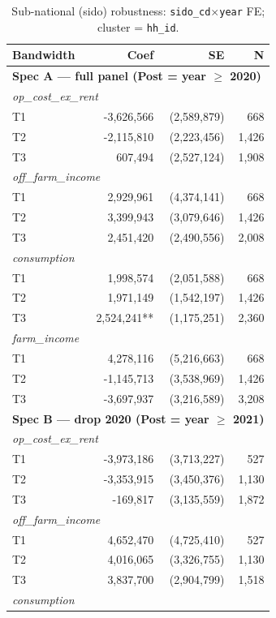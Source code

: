 \begin{table}[t]
\centering
\caption{Sub-national (sido) robustness: \texttt{sido\_cd}$\times$\texttt{year} FE; cluster = \texttt{hh\_id}.}
\label{tab:sido_robustness_en}
\begin{tabular}{lrrr}
\toprule
Bandwidth & Coef & SE & N \\
\midrule
\multicolumn{4}{l}{\textbf{Spec A — full panel (Post = year $\ge$ 2020)}} \\
\multicolumn{4}{l}{\textit{op\_cost\_ex\_rent}} \\
T1 & -3,626,566 & (2,589,879) & 668 \\
T2 & -2,115,810 & (2,223,456) & 1,426 \\
T3 & 607,494 & (2,527,124) & 1,908 \\
\multicolumn{4}{l}{\textit{off\_farm\_income}} \\
T1 & 2,929,961 & (4,374,141) & 668 \\
T2 & 3,399,943 & (3,079,646) & 1,426 \\
T3 & 2,451,420 & (2,490,556) & 2,008 \\
\multicolumn{4}{l}{\textit{consumption}} \\
T1 & 1,998,574 & (2,051,588) & 668 \\
T2 & 1,971,149 & (1,542,197) & 1,426 \\
T3 & 2,524,241** & (1,175,251) & 2,360 \\
\multicolumn{4}{l}{\textit{farm\_income}} \\
T1 & 4,278,116 & (5,216,663) & 668 \\
T2 & -1,145,713 & (3,538,969) & 1,426 \\
T3 & -3,697,937 & (3,216,589) & 3,208 \\
\midrule
\multicolumn{4}{l}{\textbf{Spec B — drop 2020 (Post = year $\ge$ 2021)}} \\
\multicolumn{4}{l}{\textit{op\_cost\_ex\_rent}} \\
T1 & -3,973,186 & (3,713,227) & 527 \\
T2 & -3,353,915 & (3,450,376) & 1,130 \\
T3 & -169,817 & (3,135,559) & 1,872 \\
\multicolumn{4}{l}{\textit{off\_farm\_income}} \\
T1 & 4,652,470 & (4,725,410) & 527 \\
T2 & 4,016,065 & (3,326,755) & 1,130 \\
T3 & 3,837,700 & (2,904,799) & 1,518 \\
\multicolumn{4}{l}{\textit{consumption}} \\

\end{tabular}
\end{table}
